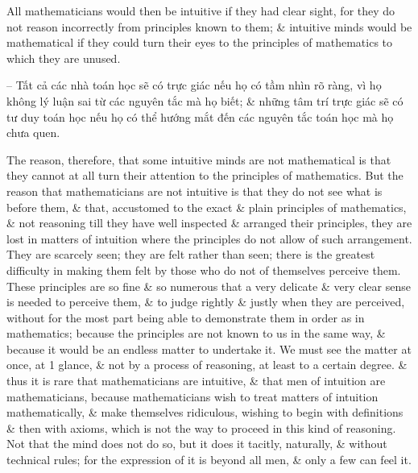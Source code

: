 \documentclass{article}
\begin{document}
\begin{enumerate}
\begin{itemize}
		All mathematicians would then be intuitive if they had clear sight, for they do not reason incorrectly from principles known to them; \& intuitive minds would be mathematical if they could turn their eyes to the principles of mathematics to which they are unused.
		
		-- Tất cả các nhà toán học sẽ có trực giác nếu họ có tầm nhìn rõ ràng, vì họ không lý luận sai từ các nguyên tắc mà họ biết; \& những tâm trí trực giác sẽ có tư duy toán học nếu họ có thể hướng mắt đến các nguyên tắc toán học mà họ chưa quen.
		
		The reason, therefore, that some intuitive minds are not mathematical is that they cannot at all turn their attention to the principles of mathematics. But the reason that mathematicians are not intuitive is that they do not see what is before them, \& that, accustomed to the exact \& plain principles of mathematics, \& not reasoning till they have well inspected \& arranged their principles, they are lost in matters of intuition where the principles do not allow of such arrangement. They are scarcely seen; they are felt rather than seen; there is the greatest difficulty in making them felt by those who do not of themselves perceive them. These principles are so fine \& so numerous that a very delicate \& very clear sense is needed to perceive them, \& to judge rightly \& justly when they are perceived, without for the most part being able to demonstrate them in order as in mathematics; because the principles are not known to us in the same way, \& because it would be an endless matter to undertake it. We must see the matter at once, at 1 glance, \& not by a process of reasoning, at least to a certain degree. \& thus it is rare that mathematicians are intuitive, \& that men of intuition are mathematicians, because mathematicians wish to treat matters of intuition mathematically, \& make themselves ridiculous, wishing to begin with definitions \& then with axioms, which is not the way to proceed in this kind of reasoning. Not that the mind does not do so, but it does it tacitly, naturally, \& without technical rules; for the expression of it is beyond all men, \& only a few can feel it.
		

\end{itemize}
\end{enumerate}
\end{document}
